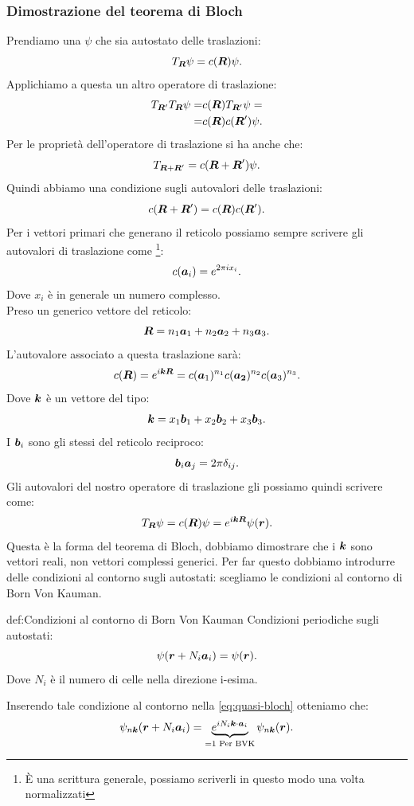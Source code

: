 \subsubsection{Dimostrazione del teorema di Bloch}
\label{subsubsec:Dimostrazione del teorema di Bloch}
Prendiamo una $\psi$ che sia autostato delle traslazioni:
\[
	T_{\boldsymbol{R}}\psi  = c(\boldsymbol{R})\psi
.\] 
Applichiamo a questa un altro operatore di traslazione:
\[\begin{aligned}
	T_{\boldsymbol{R}'}T_{\boldsymbol{R}}\psi 
	=&
	c(\boldsymbol{R})T_{\boldsymbol{R}'}\psi  =\\
	=&
	c(\boldsymbol{R})c(\boldsymbol{R}')\psi
.\end{aligned}\]
Per le proprietà dell'operatore di traslazione si ha anche che:
\[
	T_{\boldsymbol{R}+\boldsymbol{R}'} = c(\boldsymbol{R}+\boldsymbol{R}')\psi
.\] 
Quindi abbiamo una condizione sugli autovalori delle traslazioni:
\[
	c(\boldsymbol{R}+\boldsymbol{R}') = c(\boldsymbol{R})c(\boldsymbol{R}')
.\] 
Per i vettori primari che generano il reticolo possiamo sempre scrivere gli autovalori di traslazione come \footnote{È una scrittura generale, possiamo scriverli in questo modo una volta normalizzati}:
\[
	c(\boldsymbol{a}_i) = e^{2\pi i x_i}
.\] 
Dove $x_i$ è in generale un numero complesso.\\
Preso un generico vettore del reticolo:
\[
	\boldsymbol{R}=n_1\boldsymbol{a}_1+n_2\boldsymbol{a}_2+n_3\boldsymbol{a}_3
.\] 
L'autovalore associato a questa traslazione sarà:
\[
	c(\boldsymbol{R})=e^{i\boldsymbol{k}\boldsymbol{R}}=c(\boldsymbol{a}_1)^{n_1}c(\boldsymbol{a_2})^{n_2}c(\boldsymbol{a}_3)^{n_3}
.\] 
Dove $\boldsymbol{k}$ è un vettore del tipo:
\[
	\boldsymbol{k}= x_1\boldsymbol{b}_1+x_2\boldsymbol{b}_2+x_3\boldsymbol{b}_3
.\] 
I $\boldsymbol{b}_i$ sono gli stessi del reticolo reciproco:
\[
	\boldsymbol{b}_i\boldsymbol{a}_j= 2\pi\delta_{ij}
.\] 
Gli autovalori del nostro operatore di traslazione gli possiamo quindi scrivere come:
\[
	T_{\boldsymbol{R}}\psi= c(\boldsymbol{R})\psi=e^{i\boldsymbol{k}\boldsymbol{R}}\psi(\boldsymbol{r}) \label{eq:quasi-bloch}
.\] 
Questa è la forma del teorema di Bloch, dobbiamo dimostrare che i $\boldsymbol{k}$ sono vettori reali, non vettori complessi generici. Per far questo dobbiamo introdurre delle condizioni al contorno sugli autostati: scegliamo le condizioni al contorno di Born Von Kauman.\\
\begin{defn}{def:Condizioni al contorno di Born Von Kauman}
	Condizioni periodiche sugli autostati:
	\[
	\psi(\boldsymbol{r}+N_i\boldsymbol{a}_i)=\psi(\boldsymbol{r})
	.\]
	Dove $N_i$ è il numero di celle nella direzione i-esima.
\end{defn}
Inserendo tale condizione al contorno nella \ref{eq:quasi-bloch} otteniamo che:
\[
	\psi_{n\boldsymbol{k}}(\boldsymbol{r}+N_i\boldsymbol{a}_i)
	= \underbrace{e^{iN_i\boldsymbol{k}\cdot\boldsymbol{a}_i}}_{=1 \text{ Per BVK}}
	\psi_{n\boldsymbol{k}}(\boldsymbol{r})
.\] 
